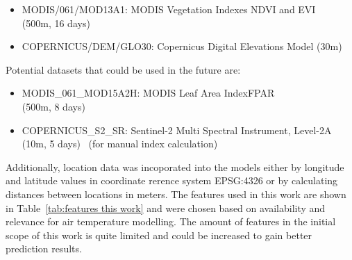 \begin{itemize}
    \item MODIS/061/MOD13A1: MODIS Vegetation Indexes NDVI and EVI\\
    (500m, 16 days)~\cite{didan2021modis}
    \item COPERNICUS/DEM/GLO30: Copernicus Digital Elevations Model (30m)~\cite{copernicus30dem}
\end{itemize}

Potential datasets that could be used in the future are:

\begin{itemize}
    \item MODIS\_061\_MOD15A2H: MODIS Leaf Area Index\/FPAR \\
    (500m, 8 days)~\cite{myneni2021modis}
    \item COPERNICUS\_S2\_SR: Sentinel-2 Multi Spectral Instrument, Level-2A\\
    (10m, 5 days)~\cite{sentinel2msi} (for manual index calculation)
\end{itemize}

Additionally, location data was incoporated into the models either by longitude and latitude values in coordinate rerence system EPSG:4326 or by calculating distances between locations in meters.
The features used in this work are shown in Table~\ref{tab:features this work} and were chosen based on availability and relevance for air temperature modelling.
The amount of features in the initial scope of this work is quite limited and could be increased to gain better prediction results.

